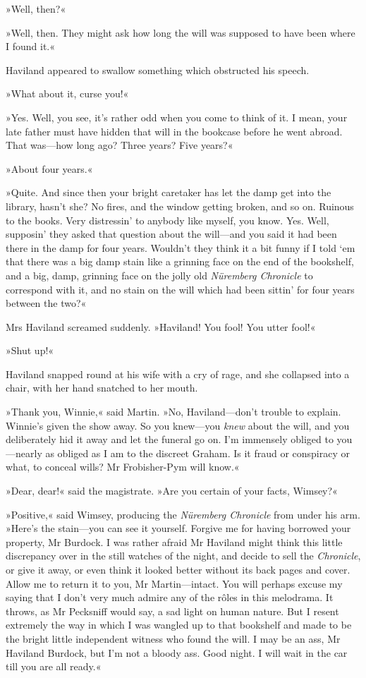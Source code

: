 »Well, then?«

»Well, then. They might ask how long the will was supposed to have been where I found it.«

Haviland appeared to swallow something which obstructed his speech.

»What about it, curse you!«

»Yes. Well, you see, it's rather odd when you come to think of it. I mean, your late father must have hidden that will in the bookcase before he went abroad. That was—how long ago? Three years? Five years?«

»About four years.«

»Quite. And since then your bright caretaker has let the damp get into the library, hasn't she? No fires, and the window getting broken, and so on. Ruinous to the books. Very distressin' to anybody like myself, you know. Yes. Well, supposin' they asked that question about the will—and you said it had been there in the damp for four years. Wouldn't they think it a bit funny if I told `em that there was a big damp stain like a grinning face on the end of the bookshelf, and a big, damp, grinning face on the jolly old \textit{Nüremberg Chronicle} to correspond with it, and no stain on the will which had been sittin' for four years between the two?«

Mrs Haviland screamed suddenly. »Haviland! You fool! You utter fool!«

»Shut up!«

Haviland snapped round at his wife with a cry of rage, and she collapsed into a chair, with her hand snatched to her mouth.

»Thank you, Winnie,« said Martin. »No, Haviland—don't trouble to explain. Winnie's given the show away. So you knew—you \textit{knew} about the will, and you deliberately hid it away and let the funeral go on. I'm immensely obliged to you—nearly as obliged as I am to the discreet Graham. Is it fraud or conspiracy or what, to conceal wills? Mr Frobisher-Pym will know.«

»Dear, dear!« said the magistrate. »Are you certain of your facts, Wimsey?«

»Positive,« said Wimsey, producing the \textit{Nüremberg Chronicle} from under his arm. »Here's the stain—you can see it yourself. Forgive me for having borrowed your property, Mr Burdock. I was rather afraid Mr Haviland might think this little discrepancy over in the still watches of the night, and decide to sell the \textit{Chronicle}, or give it away, or even think it looked better without its back pages and cover. Allow me to return it to you, Mr Martin—intact. You will perhaps excuse my saying that I don't very much admire any of the rôles in this melodrama. It throws, as Mr Pecksniff would say, a sad light on human nature. But I resent extremely the way in which I was wangled up to that bookshelf and made to be the bright little independent witness who found the will. I may be an ass, Mr Haviland Burdock, but I'm not a bloody ass. Good night. I will wait in the car till you are all ready.«

